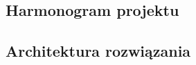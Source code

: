 \documentclass[10pt,a4paper]{article}
\begin{document}
\subsection{Harmonogram projektu}
%
% 

\subsection{Architektura rozwiązania}
% 
\end{document}
